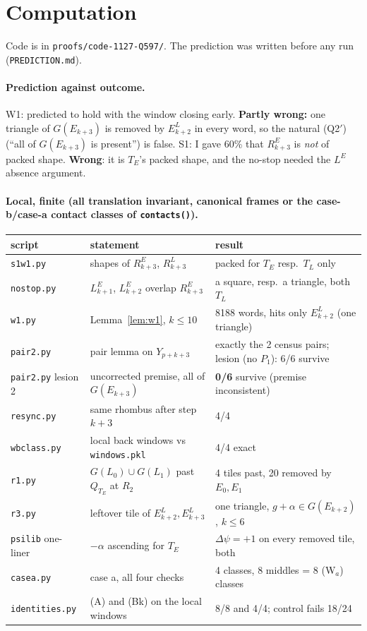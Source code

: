 \documentclass[11pt]{article}
\theoremstyle{remark}\newtheorem{remark}[theorem]{Remark}
\begin{document}
\section{Computation}
Code is in \texttt{proofs/code-1127-Q597/}. The prediction was written before any run (\texttt{PREDICTION.md}).
\paragraph{Prediction against outcome.} W1: predicted to hold with the window closing early. \textbf{Partly wrong:} one triangle of $G(E_{k+3})$ is removed by $E^L_{k+2}$ in every word, so the natural (Q2$'$) (``all of $G(E_{k+3})$ is present'') is false. S1: I gave 60\% that $R^E_{k+3}$ is \emph{not} of packed shape. \textbf{Wrong}: it is $T_E$'s packed shape, and the no-stop needed the $L^E$ absence argument.
\paragraph{Local, finite (all translation invariant, canonical frames or the case-b/case-a contact classes of \texttt{contacts()}).}
\begin{center}\small\begin{tabular}{lll}\toprule
script & statement & result\\\midrule
\texttt{s1w1.py} & shapes of $R^E_{k+3}$, $R^L_{k+3}$ & packed for $T_E$ resp.\ $T_L$ only\\
\texttt{nostop.py} & $L^E_{k+1}$, $L^E_{k+2}$ overlap $R^E_{k+3}$ & a square, resp.\ a triangle, both $T_L$\\
\texttt{w1.py} & Lemma~\ref{lem:w1}, $k\le10$ & 8188 words, hits only $E^L_{k+2}$ (one triangle)\\
\texttt{pair2.py} & pair lemma on $Y_{p+k+3}$ & exactly the 2 census pairs; lesion (no $P_1$): 6/6 survive\\
\texttt{pair2.py} lesion 2 & uncorrected premise, all of $G(E_{k+3})$ & \textbf{0/6} survive (premise inconsistent)\\
\texttt{resync.py} & same rhombus after step $k+3$ & 4/4\\
\texttt{wbclass.py} & local back windows vs \texttt{windows.pkl} & 4/4 exact\\
\texttt{r1.py} & $G(L_0)\cup G(L_1)$ past $Q_{T_E}$ at $R_2$ & 4 tiles past, 20 removed by $E_0,E_1$\\
\texttt{r3.py} & leftover tile of $E^L_{k+2},E^L_{k+3}$ & one triangle, $g+\alpha\in G(E_{k+2})$, $k\le6$\\
\texttt{psilib} one-liner & $-\alpha$ ascending for $T_E$ & $\Delta\psi=+1$ on every removed tile, both\\
\texttt{casea.py} & case a, all four checks & 4 classes, 8 middles = 8 (W$_a$) classes\\
\texttt{identities.py} & (A) and (Bk) on the local windows & 8/8 and 4/4; control fails 18/24\\\bottomrule
\end{tabular}\end{center}
\end{document}

